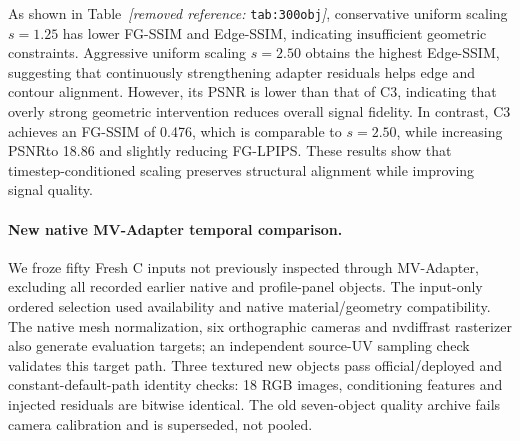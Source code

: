 \documentclass[times,twocolumn,final]{elsarticle}
\providecommand{\DIFadd}[1]{{\protect\color{blue} \sf #1}} %
\providecommand{\DIFdel}[1]{{\protect\color{red} \scriptsize #1}} %
\providecommand{\DIFaddbegin}{} %
\providecommand{\DIFaddend}{} %
\providecommand{\DIFdelbegin}{} %
\providecommand{\DIFdelend}{} %
\begin{document}
\DIFdelbegin %

\DIFdel{As shown in Table~\textit{[removed reference: }\texttt{tab:300obj}\textit{]}, conservative uniform scaling $s = 1.25$ has lower FG-SSIM and Edge-SSIM, indicating insufficient geometric constraints. Aggressive uniform scaling $s = 2.50$ obtains the highest Edge-SSIM, suggesting that continuously strengthening adapter residuals helps edge and contour alignment. However, its PSNR is lower than that of C3, indicating that overly strong geometric intervention reduces overall signal fidelity. In contrast, C3 achieves an FG-SSIM of 0.476, which is comparable to $s = 2.50$, while increasing PSNRto 18.86 and slightly reducing FG-LPIPS. These results show that timestep-conditioned scaling preserves structural alignment while improving signal quality.
}\DIFdelend \DIFaddbegin \paragraph{New native MV-Adapter temporal comparison.}
\label{subsec:new-mva}
\DIFadd{We froze fifty Fresh C inputs not previously inspected through MV-Adapter, excluding all recorded earlier native and profile-panel objects. The input-only ordered selection used availability and native material/geometry compatibility. The native mesh normalization, six orthographic cameras and nvdiffrast rasterizer also generate evaluation targets; an independent source-UV sampling check validates this target path. Three textured new objects pass official/deployed and constant-default-path identity checks: 18 RGB images, conditioning features and injected residuals are bitwise identical. The old seven-object quality archive fails camera calibration and is superseded, not pooled.
}\DIFaddend 
\end{document}
